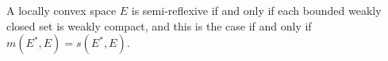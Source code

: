 A locally convex space $E$ is semi-reflexive if and only if each bounded weakly closed set is weakly compact, and this is the case if and only if $m(E^{*}, E) = s(E^{*}, E)$.
